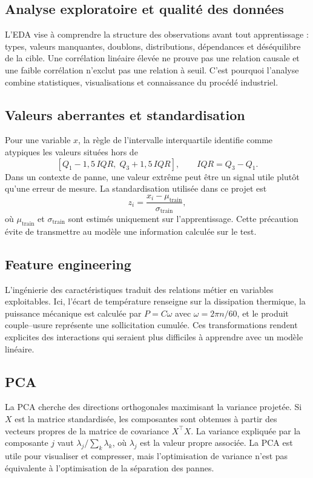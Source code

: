 \documentclass[12pt,a4paper]{article}
\begin{document}
\subsection{Analyse exploratoire et qualité des données}
L'EDA vise à comprendre la structure des observations avant tout apprentissage : types, valeurs manquantes, doublons, distributions, dépendances et déséquilibre de la cible. Une corrélation linéaire élevée ne prouve pas une relation causale et une faible corrélation n'exclut pas une relation à seuil. C'est pourquoi l'analyse combine statistiques, visualisations et connaissance du procédé industriel.

\subsection{Valeurs aberrantes et standardisation}
Pour une variable $x$, la règle de l'intervalle interquartile identifie comme atypiques les valeurs situées hors de
\[
[Q_1-1{,}5\,IQR,\;Q_3+1{,}5\,IQR],\qquad IQR=Q_3-Q_1.
\]
Dans un contexte de panne, une valeur extrême peut être un signal utile plutôt qu'une erreur de mesure. La standardisation utilisée dans ce projet est
\[
z_i=\frac{x_i-\mu_{\mathrm{train}}}{\sigma_{\mathrm{train}}},
\]
où $\mu_{\mathrm{train}}$ et $\sigma_{\mathrm{train}}$ sont estimés uniquement sur l'apprentissage. Cette précaution évite de transmettre au modèle une information calculée sur le test.

\subsection{Feature engineering}
L'ingénierie des caractéristiques traduit des relations métier en variables exploitables. Ici, l'écart de température renseigne sur la dissipation thermique, la puissance mécanique est calculée par $P=C\omega$ avec $\omega=2\pi n/60$, et le produit couple--usure représente une sollicitation cumulée. Ces transformations rendent explicites des interactions qui seraient plus difficiles à apprendre avec un modèle linéaire.

\subsection{PCA}
La PCA cherche des directions orthogonales maximisant la variance projetée. Si $X$ est la matrice standardisée, les composantes sont obtenues à partir des vecteurs propres de la matrice de covariance $X^\top X$. La variance expliquée par la composante $j$ vaut $\lambda_j/\sum_k\lambda_k$, où $\lambda_j$ est la valeur propre associée. La PCA est utile pour visualiser et compresser, mais l'optimisation de variance n'est pas équivalente à l'optimisation de la séparation des pannes.
\end{document}
